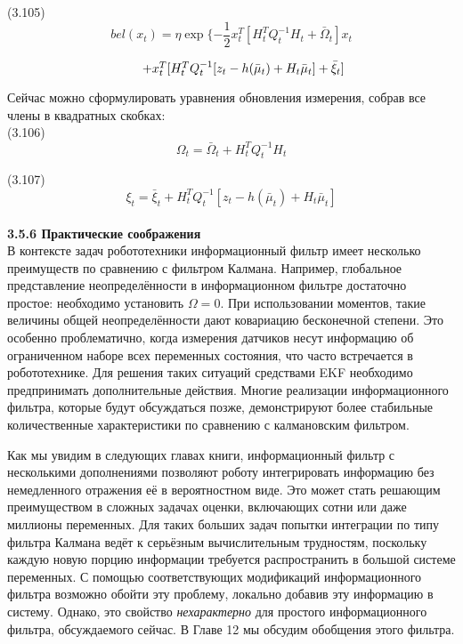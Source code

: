 \documentclass[10pt,a4paper]{article}
\begin{document}
(3.105)
$$bel(x_t)=\eta\exp\{-\frac{1}{2}x_t^T[H_t^T Q_t^{-1}H_t+\bar{\varOmega}_t]x_t$$

$\hspace{38mm}+x_t^T[H_t^T Q_t^{-1}[z_t-h(\bar{\mu}_t)+H_t\bar{\mu}_t]+\bar{\xi}_t]$

Сейчас можно сформулировать уравнения обновления измерения, собрав все члены в квадратных скобках:\\

(3.106)
$$\varOmega_t=\bar{\varOmega}_t+H_t^T Q_t^{-1}H_t$$

(3.107)
$$\xi_t=\bar{\xi}_t+H_t^T Q_t^{-1}[z_t-h(\bar{\mu}_t)+H_t\bar{\mu}_t]$$\\

\textbf{3.5.6 Практические соображения}\\

В контексте задач робототехники информационный фильтр имеет несколько преимуществ по сравнению с фильтром Калмана. Например, глобальное представление неопределённости в информационном фильтре достаточно простое: необходимо установить $\varOmega=0$. При использовании моментов, такие величины общей неопределённости дают ковариацию бесконечной степени. Это особенно проблематично, когда измерения датчиков несут информацию об ограниченном наборе всех переменных состояния, что часто встречается в робототехнике. Для решения таких ситуаций средствами EKF необходимо предпринимать дополнительные действия. Многие реализации информационного фильтра, которые будут обсуждаться позже, демонстрируют более стабильные количественные характеристики по сравнению с калмановским фильтром.

Как мы увидим в следующих главах книги, информационный фильтр с несколькими дополнениями позволяют роботу интегрировать информацию без немедленного отражения её в вероятностном виде. Это может стать решающим преимуществом в сложных задачах оценки, включающих сотни или даже миллионы переменных. Для таких больших задач попытки интеграции по типу фильтра Калмана ведёт к серьёзным вычислительным трудностям, поскольку каждую новую порцию информации требуется распространить  в большой системе переменных.  С помощью соответствующих модификаций информационного фильтра возможно обойти эту проблему, локально добавив эту информацию в систему. Однако, это свойство \textit{нехарактерно} для простого информационного фильтра, обсуждаемого сейчас. В Главе 12 мы обсудим обобщения этого фильтра.
\end{document}
